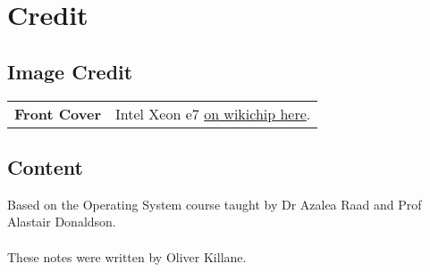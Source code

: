 \chapter{Credit}
\section*{Image Credit}
\begin{center}
    \begin{tabular}{r p{}}
        \textbf{Front Cover} & Intel Xeon e7 \href{https://en.wikichip.org/wiki/File:intel_xeon_e7_die_shot.jpg}{on wikichip here}. \\
    \end{tabular}
\end{center}

\section*{Content}
Based on the Operating System course taught by Dr Azalea Raad and Prof Alastair Donaldson.
\\
\\ These notes were written by Oliver Killane.
